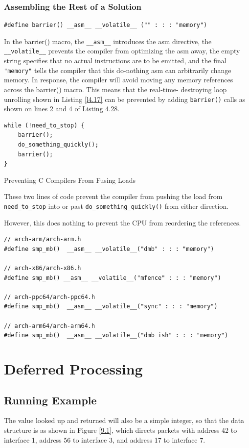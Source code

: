 \documentclass[11pt]{article}
\begin{document}
\subsubsection{Assembling the Rest of a Solution}
\label{sec:org41560d4}
\begin{verbatim}
#define barrier() __asm__ __volatile__ ("" : : : "memory")
\end{verbatim}
In the barrier() macro, the \texttt{\_\_asm\_\_} introduces the asm directive, the \texttt{\_\_volatile\_\_} prevents the
compiler from optimizing the asm away, the empty string specifies that no actual instructions are to
be emitted, and the final \texttt{"memory"} tells the compiler that this do-nothing asm can arbitrarily change
memory. In response, the compiler will avoid moving any memory references across the barrier() macro.
This means that the real-time- destroying loop unrolling shown in Listing \ref{l4.17} can be prevented
by adding \texttt{barrier()} calls as shown on lines 2 and 4 of Listing 4.28.
\begin{listing}[htbp]
\begin{verbatim}
while (!need_to_stop) {
    barrier();
    do_something_quickly();
    barrier();
}
\end{verbatim}
\caption{\label{l4.28}Preventing C Compilers From Fusing Loads}
\end{listing}
These two lines of code prevent the compiler from pushing the load from \texttt{need\_to\_stop} into or past
\texttt{do\_something\_quickly()} from either direction.

However, this does nothing to prevent the CPU from reordering the references.
\begin{verbatim}
// arch-arm/arch-arm.h
#define smp_mb()  __asm__ __volatile__("dmb" : : : "memory")

// arch-x86/arch-x86.h
#define smp_mb() __asm__ __volatile__("mfence" : : : "memory")

// arch-ppc64/arch-ppc64.h
#define smp_mb()  __asm__ __volatile__("sync" : : : "memory")

// arch-arm64/arch-arm64.h
#define smp_mb()  __asm__ __volatile__("dmb ish" : : : "memory")
\end{verbatim}
\section{Deferred Processing}
\label{sec:org1b8666b}
\subsection{Running Example}
\label{sec:orga08b56c}
The value looked up and returned will also be a simple integer, so that the data structure is as shown
in Figure \ref{9.1}, which directs packets with address 42 to interface 1, address 56 to interface 3,
and address 17 to interface 7.
\end{document}
